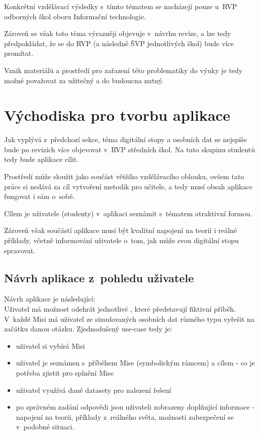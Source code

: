 Konkrétní vzdělávací výsledky s~tímto tématem se nacházejí pouze u~RVP odborných škol oboru Informační technologie.

Zároveň se však toto téma výrazněji objevuje v~návrhu revize, a lze tedy předpokládat, že se do RVP (a následně ŠVP jednotlivých škol) bude více promítat.

Vznik materiálů a prostředí pro zařazení této problematiky do výuky je tedy možné považovat za užitečný a do budoucna nutný.



\section{Východiska pro tvorbu aplikace}
Jak vyplývá z~předchozí sekce, téma digitální stopy a osobních dat se nejspíše bude po revizích více objevovat v~RVP středních škol. Na tuto skupinu studentů tedy bude aplikace cílit.

Prostředí může sloužit jako součást většího vzdělávacího oblouku, ovšem tato práce si nedává za cíl vytvoření metodik pro učitele, a tedy musí obsah aplikace fungovat i sám o~sobě.

Cílem je uživatele (studenty) v~aplikaci seznámit s~tématem atraktivní formou.

Zároveň však součástí aplikace musí být kvalitní napojení na teorii i reálné příklady, včetně informování uživatele o~tom, jak může svou digitální stopu spravovat.

\subsection{Návrh aplikace z~pohledu uživatele}
Návrh aplikace je následující:\\
Uživatel má možnost odehrát jednotlivé , které představují fiktivní příběh. V~každé Misi má uživatel ze simulovaných osobních dat různého typu vyřešit na začátku danou otázku.
Zjednodušený use-case tedy je:
\begin{itemize}
	\item uživatel si vybírá Misi
	\item uživatel je seznámen s~příběhem Mise (symbolickým rámcem) a cílem - co je potřeba zjistit pro splnění Mise
	\item uživatel využívá dané datasety pro nalezení řešení
	\item po správném zadání odpovědi jsou uživateli zobrazeny doplňující informace - napojení na teorii, příklady z~reálného světa, možnosti zabezpečení se v~podobné situaci.
\end{itemize}


